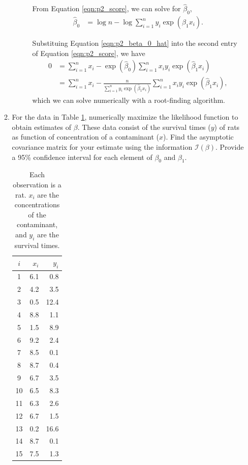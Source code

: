 \documentclass[letterpaper,11pt]{article}
\begin{document}
\begin{enumerate}
\begin{enumerate}
\begin{description}
      From Equation \ref{eqn:p2_score}, we can solve for $\hat{\beta}_0$,
      \begin{align}
        \hat{\beta}_0
        &= \log n - \log \sum_{i=1}^n y_i\exp\left(\hat{\beta}_1x_i\right).
        \label{eqn:p2_beta_0_hat}
      \end{align}

      Substituing Equation \ref{eqn:p2_beta_0_hat} into the second entry of
      Equation \ref{eqn:p2_score}, we have
      \begin{align}
        0
        &= \sum_{i=1}^n x_i -
          \exp\left(\hat{\beta}_0\right)
          \sum_{i=1}^nx_iy_i\exp\left(\hat{\beta}_1x_i\right) \nonumber\\
        &= \sum_{i=1}^n x_i -
          \frac{n}{\sum_{i=1}^ny_i\exp\left(\hat{\beta}_1x_i\right)}
          \sum_{i=1}^nx_iy_i\exp\left(\hat{\beta}_1x_i\right),
        \label{eqn:p2_beta_1_hat}
      \end{align}
      which we can solve numerically with a root-finding algorithm.            
    \end{description}
  \item For the data in Table \ref{tab:p2_data}, numerically maximize the
    likelihood function to obtain estimates of $\beta$. These data consist of
    the survival times ($y$) of rats as function of concentration of a
    contaminant ($x$). Find the asymptotic covariance matrix for your estimate
    using the information $\mathcal{I}\left(\beta\right)$. Provide a 95\%
    confidence interval for each element of $\beta_0$ and $\beta_1$.
    
    \begin{table}
      \centering
      \begin{tabular}{crr}
        \toprule
        $i$ & $x_i$ & $y_i$ \\
        \midrule
        1 & 6.1 & 0.8 \\
        2 & 4.2 & 3.5 \\
        3 & 0.5 & 12.4 \\
        4 & 8.8 & 1.1 \\
        5 & 1.5 & 8.9 \\
        6 & 9.2 & 2.4 \\
        7 & 8.5 & 0.1 \\
        8 & 8.7 & 0.4 \\
        9 & 6.7 & 3.5 \\
        10 & 6.5 & 8.3 \\
        11 & 6.3 & 2.6 \\
        12 & 6.7 & 1.5 \\
        13 & 0.2 & 16.6 \\
        14 & 8.7 & 0.1 \\
        15 & 7.5 & 1.3 \\
        \bottomrule
      \end{tabular}
      \caption{Each observation is a rat. $x_i$ are the concentrations of the
        contaminant, and $y_i$ are the survival times.}
      \label{tab:p2_data}
    \end{table}


\end{enumerate}
\end{enumerate}
\end{document}
